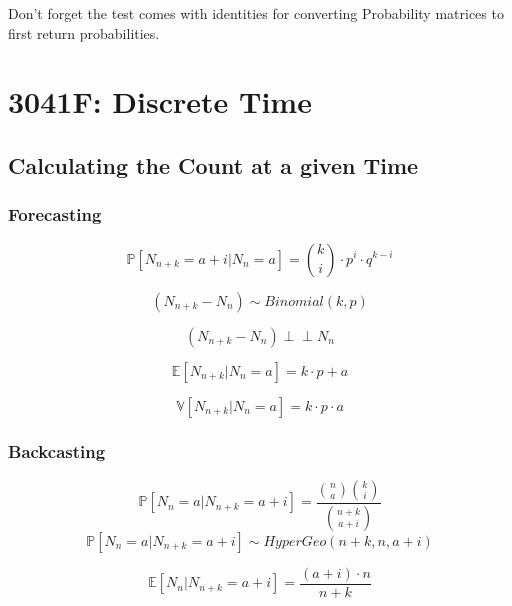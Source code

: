 \documentclass[12pt]{article}
\newcommand{\indep}{\perp \!\!\! \perp}
\begin{document}
Don't forget the test comes with identities for converting Probability matrices to first return probabilities.
\section{3041F: Discrete Time}
\subsection{Calculating the Count at a given Time}
\subsubsection{Forecasting}
\begin{equation}
    \mathbb{P}[N_{n+k} = a + i | N_n = a] = 
    \binom{k}{i} \cdot p^i \cdot q^{k-i}
\end{equation}

\begin{equation}
    (N_{n+k} - N_n) \sim Binomial(k, p)
\end{equation}

\begin{equation}
    (N_{n+k} - N_n) \indep N_n
\end{equation}

\begin{equation}
    \mathbb{E}[N_{n+k} | N_n = a] = k \cdot p + a
\end{equation}

\begin{equation}
    \mathbb{V}[N_{n+k} | N_n = a] = k \cdot p \cdot a
\end{equation}

\subsubsection{Backcasting}
\begin{equation}
    \mathbb{P}[N_n = a | N_{n+k} = a + i] = 
    \frac{
        \binom{n}{a} \binom{k}{i}
        }{
        \binom{n+k}{a+i}
    }
\end{equation}
\begin{equation}
    \mathbb{P}[N_n = a | N_{n+k} = a + i] \sim HyperGeo(n+k, n, a+i)
\end{equation}

\begin{equation}
    \mathbb{E}[N_n | N_{n+k} = a + i] = \frac{(a + i) \cdot n}{n + k}
\end{equation}
\end{document}
